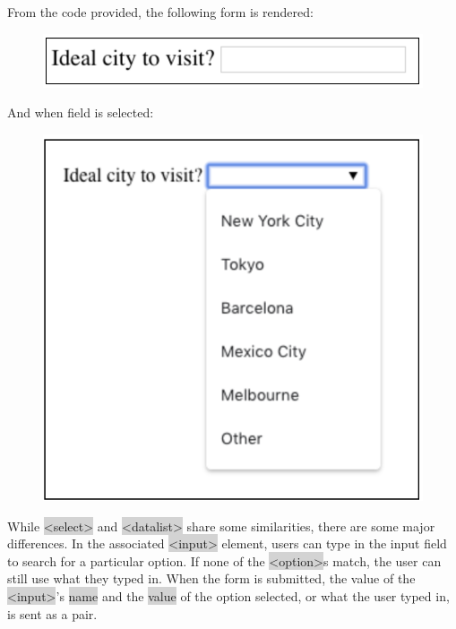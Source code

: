 \documentclass[11pt]{article}
\begin{document}
From the code provided, the following form is rendered:
\begin{figure}[H]
\includegraphics[scale = 0.5]{3_13}
\centering
\end{figure}
\vspace{-4mm}
And when field is selected:
\begin{figure}[H]
\includegraphics[scale = 0.5]{3_14}
\centering
\end{figure}
\vspace{-4mm}
While \colorbox{lightgray}{<select>} and \colorbox{lightgray}{<datalist>} share some similarities, there are some major differences. In the associated \colorbox{lightgray}{<input>} element, users can type in the input field to search for a particular option. If none of the \colorbox{lightgray}{<option>}s match, the user can still use what they typed in. When the form is submitted, the value of the \colorbox{lightgray}{<input>}'s \colorbox{lightgray}{name} and the \colorbox{lightgray}{value} of the option selected, or what the user typed in, is sent as a pair.
\end{document}
